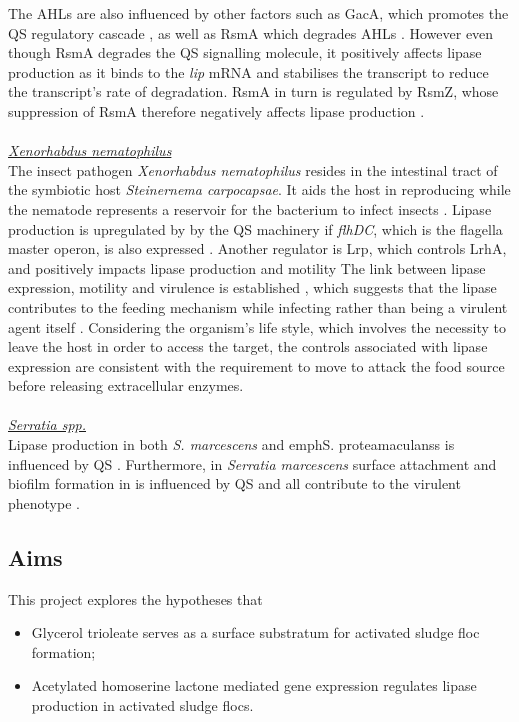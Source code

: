 \documentclass[11pt]{article}
\begin{document}
The AHLs are also influenced by other factors such as GacA, which promotes the QS regulatory cascade \cite{reimmann1997}, as well as RsmA which degrades AHLs \cite{pessi2001}. However even though RsmA degrades the QS signalling molecule, it positively affects lipase production as it binds to the \textit{lip} mRNA and stabilises the transcript to reduce the transcript's rate of degradation. RsmA in turn is regulated by RsmZ, whose suppression of RsmA therefore negatively affects lipase production \cite{heurlier2004}. 
\\
\\ \emph{\underline{Xenorhabdus nematophilus}} 
\\The insect pathogen \emph{Xenorhabdus nematophilus} resides in the intestinal tract of the symbiotic host \emph{Steinernema carpocapsae}. It aids the host in reproducing while the nematode represents a reservoir for the bacterium to infect insects \cite{herbert2007}. Lipase production is upregulated by  by the QS machinery \cite{dunphy_97} if \emph{flhDC}, which is the flagella master operon, is also expressed \cite{rosenau2000}. Another regulator is Lrp, which controls LrhA, and positively impacts lipase production and motility \cite{richards2008} 
The link between lipase expression, motility and virulence is established \cite{givaudan_00}, which suggests that the lipase contributes to the feeding mechanism while infecting rather than being a virulent agent itself \cite{richards2010}. Considering the organism's life style, which involves the necessity to leave the host in order to access the target, the controls associated with lipase expression are consistent with the requirement to move to attack the food source before releasing extracellular enzymes.
\\
\\ \emph{\underline{Serratia spp.}} 
\\Lipase production in both \emph{S. marcescens} and emph{S. proteamaculanss} is influenced by QS \cite{horng2002,shibatani2000,christensen_03}. Furthermore, in \emph{Serratia marcescens} surface attachment and biofilm formation in  is influenced by QS \cite{labbate2007} and all contribute to the virulent phenotype \cite{hejazi_97}.

\subsection{Aims}

This project explores the hypotheses that 
\begin{itemize}
\item Glycerol trioleate serves as a surface substratum for activated sludge floc formation;
\item Acetylated homoserine lactone mediated gene expression regulates lipase production in activated sludge flocs.
\end{itemize}
\end{document}
